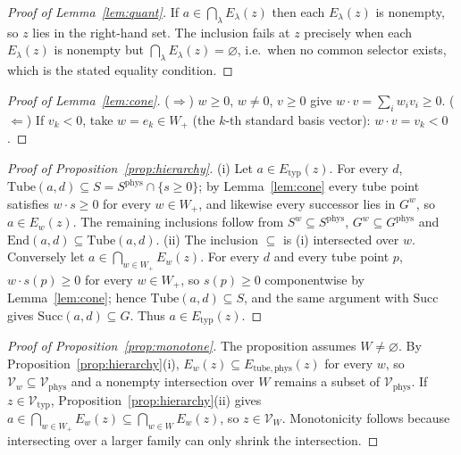 \documentclass[preprint,11pt,authoryear]{elsarticle}
\theoremstyle{definition}
\theoremstyle{remark}
\newcommand{\Etyp}{E_{\mathrm{typ}}}
\newcommand{\Ephys}{E_{\mathrm{tube,phys}}}
\newcommand{\Vtyp}{\mathcal{V}_{\mathrm{typ}}}
\newcommand{\Vphys}{\mathcal{V}_{\mathrm{phys}}}
\newcommand{\Wp}{W_+}
\newcommand{\Tube}{\mathrm{Tube}}
\newcommand{\Succ}{\mathrm{Succ}}
\newcommand{\End}{\mathrm{End}}
\begin{document}
\begin{proof}[Proof of Lemma~\ref{lem:quant}]
If $a\in\bigcap_\lambda E_\lambda(z)$ then each $E_\lambda(z)$ is nonempty, so $z$ lies in the right-hand set. The inclusion fails at $z$ precisely when each $E_\lambda(z)$ is nonempty but $\bigcap_\lambda E_\lambda(z)=\varnothing$, i.e.\ when no common selector exists, which is the stated equality condition.
\end{proof}

\begin{proof}[Proof of Lemma~\ref{lem:cone}]
($\Rightarrow$) $w\ge0$, $w\ne0$, $v\ge0$ give $w\cdot v=\sum_iw_iv_i\ge0$. ($\Leftarrow$) If $v_k<0$, take $w=e_k\in\Wp$ (the $k$-th standard basis vector): $w\cdot v=v_k<0$.
\end{proof}

\begin{proof}[Proof of Proposition~\ref{prop:hierarchy}]
(i) Let $a\in\Etyp(z)$. For every $d$, $\Tube(a,d)\subseteq S=S^{\mathrm{phys}}\cap\{s\ge0\}$; by Lemma~\ref{lem:cone} every tube point satisfies $w\cdot s\ge0$ for every $w\in\Wp$, and likewise every successor lies in $G^w$, so $a\in E_w(z)$. The remaining inclusions follow from $S^w\subseteq S^{\mathrm{phys}}$, $G^w\subseteq G^{\mathrm{phys}}$ and $\End(a,d)\subseteq\Tube(a,d)$.
(ii) The inclusion $\subseteq$ is (i) intersected over $w$. Conversely let $a\in\bigcap_{w\in\Wp}E_w(z)$. For every $d$ and every tube point $p$, $w\cdot s(p)\ge0$ for every $w\in\Wp$, so $s(p)\ge0$ componentwise by Lemma~\ref{lem:cone}; hence $\Tube(a,d)\subseteq S$, and the same argument with $\Succ$ gives $\Succ(a,d)\subseteq G$. Thus $a\in\Etyp(z)$.
\end{proof}

\begin{proof}[Proof of Proposition~\ref{prop:monotone}]
The proposition assumes $W\ne\varnothing$. By Proposition~\ref{prop:hierarchy}(i), $E_w(z)\subseteq\Ephys(z)$ for every $w$, so $\mathcal V_w\subseteq\Vphys$ and a nonempty intersection over $W$ remains a subset of $\Vphys$. If $z\in\Vtyp$, Proposition~\ref{prop:hierarchy}(ii) gives $a\in\bigcap_{w\in\Wp}E_w(z)\subseteq\bigcap_{w\in W}E_w(z)$, so $z\in\mathcal V_W$. Monotonicity follows because intersecting over a larger family can only shrink the intersection.
\end{proof}
\end{document}
